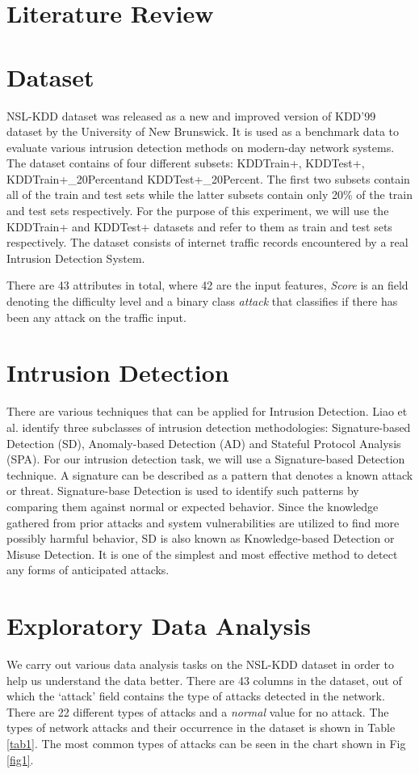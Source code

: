 \documentclass[conference]{IEEEtran}
\begin{document}
\section{Literature Review}
\section{Dataset}
NSL-KDD dataset was released as a new and improved version of KDD'99 dataset by the University of New Brunswick. It is used as a benchmark data to evaluate various intrusion detection methods on modern-day network systems.
The dataset contains of four different subsets: KDDTrain+, KDDTest+, KDDTrain+\_20Percentand KDDTest+\_20Percent. The first two subsets contain all of the train and test sets while the latter subsets contain only 20\% of the train and test sets respectively.
For the purpose of this experiment, we will use the KDDTrain+ and KDDTest+ datasets and refer to them as train and test sets respectively.
The dataset consists of internet traffic records encountered by a real Intrusion Detection System.

There are 43 attributes in total, where 42 are the input features, \emph{Score} is an field denoting the difficulty level and a binary class \emph{attack} that classifies if there has been any attack on the traffic input.

\section{Intrusion Detection}
There are various techniques that can be applied for Intrusion Detection. Liao et al. \cite{b2} identify three subclasses of intrusion detection methodologies: Signature-based Detection (SD), Anomaly-based Detection (AD) and Stateful Protocol Analysis (SPA). For our intrusion detection task, we will use a Signature-based Detection technique. A signature can be described as a pattern that denotes a known attack or threat. Signature-base Detection is used to identify such patterns by comparing them against normal or expected behavior. Since the knowledge gathered from prior attacks and system vulnerabilities are utilized to find more possibly harmful behavior, SD is also known as Knowledge-based Detection or Misuse Detection. It is one of the simplest and most effective method to detect any forms of anticipated attacks.

\section{Exploratory Data Analysis}
We carry out various data analysis tasks on the NSL-KDD dataset in order to help us understand the data better. There are 43 columns in the dataset, out of which the `attack' field contains the type of attacks detected in the network. There are 22 different types of attacks and a \emph{normal} value for no attack. The types of network attacks and their occurrence in the dataset is shown in Table \ref{tab1}. The most common types of attacks can be seen in the chart shown in Fig \ref{fig1}.
\end{document}
